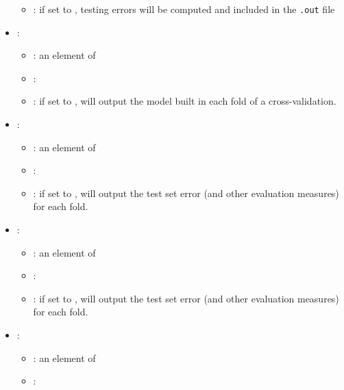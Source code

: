 \begin{itemize}
\begin{itemize}
                \item \optionDescrption{}: if set to , testing errors will be computed and included in the \texttt{.out} file
           \end{itemize}
    \item {}:
           \begin{itemize}
                \item \optionPossibleValues{}: an element of 
                \item \optionDefaultValue{}: 
                \item \optionDescrption{}: if set to , \clus{} will output the model built in each fold of a cross-validation.
           \end{itemize}
    \item {}:
           \begin{itemize}
                \item \optionPossibleValues{}: an element of  
                \item \optionDefaultValue{}: 
                \item \optionDescrption{}:  if set to , \clus{} will output the test set error (and other evaluation measures) for each fold.
           \end{itemize}
    \item {}:
           \begin{itemize}
                \item \optionPossibleValues{}: an element of 
                \item \optionDefaultValue{}: 
                \item \optionDescrption{}: if set to , \clus{} will output the test set error (and other evaluation measures) for each fold.
           \end{itemize}
    \item {}:
           \begin{itemize}
                \item \optionPossibleValues{}: an element of  
                \item \optionDefaultValue{}: 

\end{itemize}
\end{itemize}
